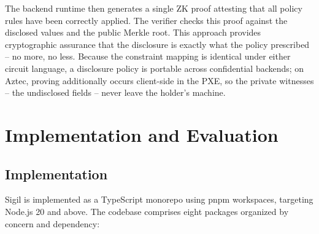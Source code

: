 \documentclass[conference]{IEEEtran}
\begin{document}
The backend runtime then generates a single ZK proof attesting that all
policy rules have been correctly applied.  The verifier checks this proof
against the disclosed values and the public Merkle root.  This approach
provides cryptographic assurance that the disclosure is exactly what the
policy prescribed -- no more, no less.  Because the constraint mapping is
identical under either circuit language, a disclosure policy is portable across
confidential backends; on Aztec, proving additionally occurs client-side in the
PXE, so the private witnesses -- the undisclosed fields -- never leave the
holder's machine.


\section{Implementation and Evaluation}

\subsection{Implementation}

Sigil is implemented as a TypeScript monorepo using pnpm workspaces, targeting
Node.js 20 and above.  The codebase comprises eight packages organized by
concern and dependency:
\end{document}
